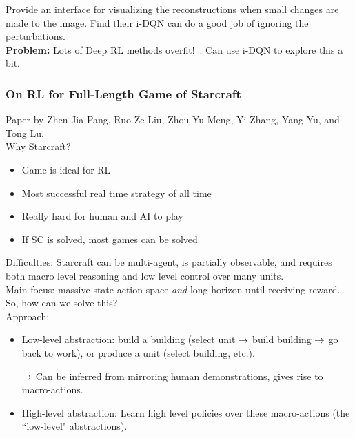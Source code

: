 Provide an interface for visualizing the reconstructions when small changes are made to the image. Find their i-DQN can do a good job of ignoring the perturbations. \\

{\bf Problem:} Lots of Deep RL methods overfit!~\cite{cobbe2018quantifying,zhang2018dissection}. Can use i-DQN to explore this a bit. 



\spacerule
\subsubsection{On RL for Full-Length Game of Starcraft~\cite{pang2018reinforcement}}

Paper by Zhen-Jia Pang, Ruo-Ze Liu, Zhou-Yu Meng, Yi Zhang, Yang Yu, and Tong Lu. \\

Why Starcraft?
\begin{itemize}
    \item Game is ideal for RL
    \item Most successful real time strategy of all time
    \item Really hard for human and AI to play
    \item If SC is solved, most games can be solved
\end{itemize}


Difficulties: Starcraft can be multi-agent, is partially observable, and requires both macro level reasoning and low level control over many units. \\

Main focus: massive state-action space {\it and} long horizon until receiving reward. So, how can we solve this? \\

Approach:
\begin{itemize}
    \item Low-level abstraction: build a building (select unit $\rightarrow$ build building $\rightarrow$ go back to work), or produce a unit (select building, etc.).
    
    $\rightarrow$ Can be inferred from mirroring human demonstrations, gives rise to macro-actions.
    
    \item High-level abstraction: Learn high level policies over these macro-actions (the ``low-level" abstractions).
\end{itemize}

